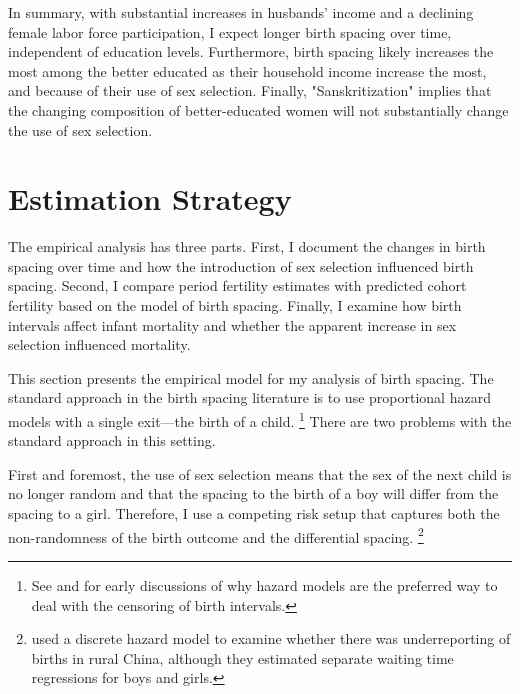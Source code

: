 \documentclass[12pt,letterpaper]{article}
\begin{document}
In summary, with substantial increases in husbands' income and a declining female labor 
force participation, I expect longer birth spacing over time, independent of education 
levels.
Furthermore, birth spacing likely increases the most among the better educated as their
household income increase the most, and because of their use of sex selection. 
Finally, "Sanskritization" implies that the changing composition of better-educated
women will not substantially change the use of sex selection.


\section{Estimation Strategy\label{sec:strategy}}


The empirical analysis has three parts. 
First, I document the changes in birth spacing over time and how the introduction of sex 
selection influenced birth spacing. 
Second, I compare period fertility estimates with predicted cohort fertility based on the 
model of birth spacing. 
Finally, I examine how birth intervals affect infant mortality and whether the apparent 
increase in sex selection influenced mortality. 

This section presents the empirical model for my analysis of birth spacing. 
The standard approach in the birth spacing literature is to use proportional hazard
models with a single exit---the birth of a child.%
\footnote{
See \citet{Sheps1970} and \citet{Newman1984} for early discussions of why 
hazard models are the preferred way to deal with the censoring of birth
intervals.
}
There are two problems with the standard approach in this setting.

First and foremost, the use of sex selection means that the sex of the next child is 
no longer random and that the spacing to the birth of a boy will differ from the 
spacing to a girl. 
Therefore, I use a competing risk setup that captures both the non-randomness of 
the birth outcome and the differential spacing.%
\footnote{
\cite{Merli2000} used a discrete hazard model to examine whether 
there was underreporting of births in rural China, although they 
estimated separate waiting time regressions for boys and girls.
}
\end{document}

